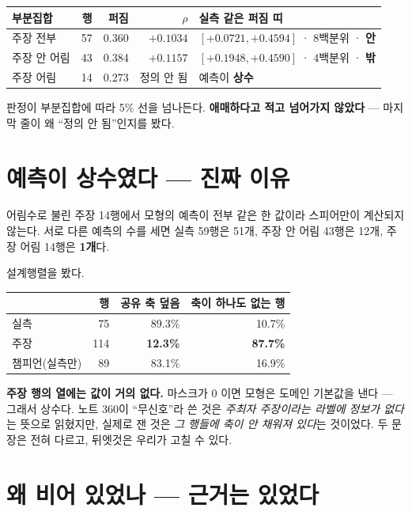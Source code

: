 \documentclass[11pt]{article}
\begin{document}
\begin{center}
\begin{tabular}{lrrrl}
\hline
부분집합 & 행 & 퍼짐 & $\rho$ & 실측 같은 퍼짐 띠 \\
\hline
주장 전부 & 57 & 0.360 & $+0.1034$ & $[+0.0721,+0.4594]$ · 8백분위 · \textbf{안} \\
주장 안 어림 & 43 & 0.384 & $+0.1157$ & $[+0.1948,+0.4590]$ · 4백분위 · \textbf{밖} \\
주장 어림 & 14 & 0.273 & 정의 안 됨 & 예측이 \textbf{상수} \\
\hline
\end{tabular}
\end{center}

판정이 부분집합에 따라 5\% 선을 넘나든다. \textbf{애매하다고 적고
넘어가지 않았다} --- 마지막 줄이 왜 ``정의 안 됨''인지를 봤다.

\section{예측이 상수였다 --- 진짜 이유}

어림수로 불린 주장 14행에서 모형의 예측이 전부 같은 한 값이라 스피어만이
계산되지 않는다. 서로 다른 예측의 수를 세면 실측 59행은 51개, 주장 안
어림 43행은 12개, 주장 어림 14행은 \textbf{1개}다.

설계행렬을 봤다.

\begin{center}
\begin{tabular}{lrrr}
\hline
 & 행 & 공유 축 덮음 & 축이 하나도 없는 행 \\
\hline
실측 & 75 & 89.3\% & 10.7\% \\
주장 & 114 & \textbf{12.3\%} & \textbf{87.7\%} \\
\hline
챔피언(실측만) & 89 & 83.1\% & 16.9\% \\
\hline
\end{tabular}
\end{center}

\textbf{주장 행의 열에는 값이 거의 없다.} 마스크가 0 이면 모형은 도메인
기본값을 낸다 --- 그래서 상수다. 노트 360이 ``무신호''라 쓴 것은
\emph{주최자 주장이라는 라벨에 정보가 없다}는 뜻으로 읽혔지만, 실제로
잰 것은 \emph{그 행들에 축이 안 채워져 있다}는 것이었다. 두 문장은 전혀
다르고, 뒤엣것은 우리가 고칠 수 있다.

\section{왜 비어 있었나 --- 근거는 있었다}
\end{document}
